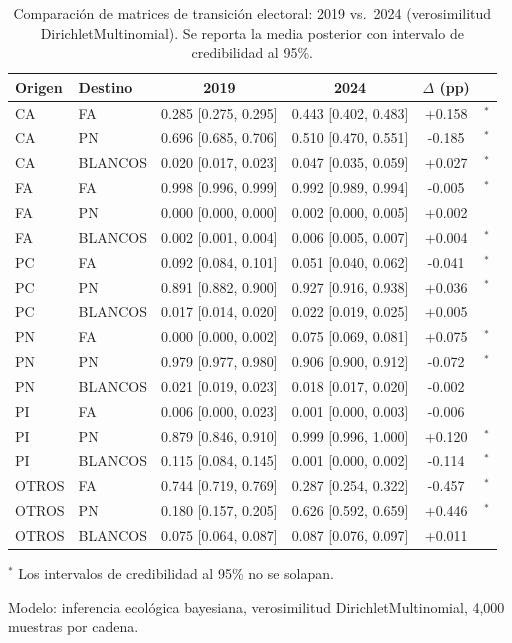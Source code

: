 
\begin{table}[htbp]
\centering
\caption{Comparaci\'{o}n de matrices de transici\'{o}n electoral: 2019 vs.\ 2024 (verosimilitud DirichletMultinomial). Se reporta la media posterior con intervalo de credibilidad al 95\%.}
\label{tab:temporal_comparison_dm}
\small
\begin{tabular}{llcccc}
\toprule
Origen & Destino & 2019 & 2024 & $\Delta$ (pp) & \\
\midrule
\textsc{CA} & FA & 0.285 [0.275, 0.295] & 0.443 [0.402, 0.483] & +0.158 & $^*$ \\
\textsc{CA} & PN & 0.696 [0.685, 0.706] & 0.510 [0.470, 0.551] & -0.185 & $^*$ \\
\textsc{CA} & BLANCOS & 0.020 [0.017, 0.023] & 0.047 [0.035, 0.059] & +0.027 & $^*$ \\
\midrule
\textsc{FA} & FA & 0.998 [0.996, 0.999] & 0.992 [0.989, 0.994] & -0.005 & $^*$ \\
\textsc{FA} & PN & 0.000 [0.000, 0.000] & 0.002 [0.000, 0.005] & +0.002 &  \\
\textsc{FA} & BLANCOS & 0.002 [0.001, 0.004] & 0.006 [0.005, 0.007] & +0.004 & $^*$ \\
\midrule
\textsc{PC} & FA & 0.092 [0.084, 0.101] & 0.051 [0.040, 0.062] & -0.041 & $^*$ \\
\textsc{PC} & PN & 0.891 [0.882, 0.900] & 0.927 [0.916, 0.938] & +0.036 & $^*$ \\
\textsc{PC} & BLANCOS & 0.017 [0.014, 0.020] & 0.022 [0.019, 0.025] & +0.005 &  \\
\midrule
\textsc{PN} & FA & 0.000 [0.000, 0.002] & 0.075 [0.069, 0.081] & +0.075 & $^*$ \\
\textsc{PN} & PN & 0.979 [0.977, 0.980] & 0.906 [0.900, 0.912] & -0.072 & $^*$ \\
\textsc{PN} & BLANCOS & 0.021 [0.019, 0.023] & 0.018 [0.017, 0.020] & -0.002 &  \\
\midrule
\textsc{PI} & FA & 0.006 [0.000, 0.023] & 0.001 [0.000, 0.003] & -0.006 &  \\
\textsc{PI} & PN & 0.879 [0.846, 0.910] & 0.999 [0.996, 1.000] & +0.120 & $^*$ \\
\textsc{PI} & BLANCOS & 0.115 [0.084, 0.145] & 0.001 [0.000, 0.002] & -0.114 & $^*$ \\
\midrule
\textsc{OTROS} & FA & 0.744 [0.719, 0.769] & 0.287 [0.254, 0.322] & -0.457 & $^*$ \\
\textsc{OTROS} & PN & 0.180 [0.157, 0.205] & 0.626 [0.592, 0.659] & +0.446 & $^*$ \\
\textsc{OTROS} & BLANCOS & 0.075 [0.064, 0.087] & 0.087 [0.076, 0.097] & +0.011 &  \\
\bottomrule
\end{tabular}
\begin{tablenotes}\small
\item $^*$ Los intervalos de credibilidad al 95\% no se solapan.
\item Modelo: inferencia ecol\'{o}gica bayesiana, verosimilitud DirichletMultinomial, 4{,}000 muestras por cadena.
\end{tablenotes}
\end{table}
